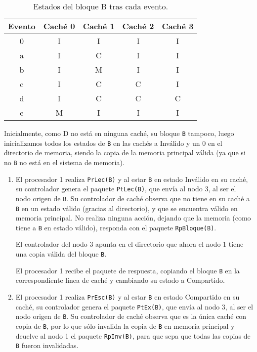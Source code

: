 \begin{ejercicio}
\begin{enumerate}
\begin{table}[H]
\centering
\begin{tabular}{c|c|c|c|c}
    Evento & Caché 0 & Caché 1 & Caché 2 & Caché 3 \\
    \hline
    0 & I & I & I & I \\
    \hline
    a & I & C & I & I \\
    \hline
    b & I & M & I & I \\
    \hline
    c & I & C & C & I \\
    \hline
    d & I & C & C & C \\
    \hline
    e & M & I & I & I \\
\end{tabular}
\caption{Estados del bloque B tras cada evento.}
\label{tab:ej_rel3_3_2}
\end{table}
Inicialmente, como D no está en ninguna caché, su bloque \verb|B| tampoco, luego inicializamos todos los estados de \verb|B| en las cachés a Inválido y un 0 en el directorio de memoria, siendo la copia de la memoria principal válida (ya que si no \verb|B| no está en el sistema de memoria).

    \begin{enumerate}
        \item El procesador 1 realiza \verb|PrLec(B)| y al estar \verb|B| en estado Inválido en su caché, su controlador genera el paquete \verb|PtLec(B)|, que envía al nodo 3, al ser el nodo origen de \verb|B|. Su controlador de caché observa que no tiene en su caché a \verb|B| en un estado válido (gracias al directorio), y que se encuentra válido en memoria principal. No realiza ninguna acción, dejando que la memoria (como tiene a \verb|B| en estado válido), responda con el paquete \verb|RpBloque(B)|. 

        El controlador del nodo 3 apunta en el directorio que ahora el nodo 1 tiene una copia válida del bloque \verb|B|.

        El procesador 1 recibe el paquete de respuesta, copiando el bloque \verb|B| en la correspondiente línea de caché y cambiando su estado a Compartido.

        \item El procesador 1 realiza \verb|PrEsc(B)| y al estar \verb|B| en estado Compartido en su caché, su controlador genera el paquete \verb|PtEx(B)|, que envía al nodo 3, al ser el nodo origen de \verb|B|. Su controlador de caché observa que es la única caché con copia de \verb|B|, por lo que sólo invalida la copia de \verb|B| en memoria principal y deuelve al nodo 1 el paquete \verb|RpInv(B)|, para que sepa que todas las copias de \verb|B| fueron invalidadas.


\end{enumerate}
\end{enumerate}
\end{ejercicio}
